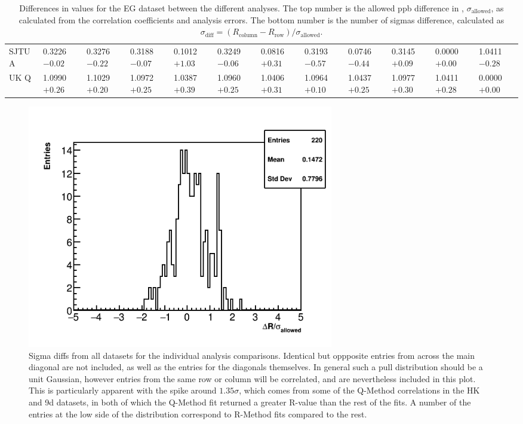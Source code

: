 \begin{landscape}
\begin{table}
\begin{tabularx}{1\linewidth}{@{\extracolsep{\fill}}lXXXXXXXXXXX}
	SJTU A & 0.3226 $-0.02$ & 0.3276 $-0.22$ & 0.3188 $-0.07$ & 0.1012 $+1.03$ & 0.3249 $-0.06$ & 0.0816 $+0.31$ & 0.3193 $-0.57$ & 0.0746 $-0.44$ & 0.3145 $+0.09$ & 0.0000 $+0.00$ & 1.0411 $-0.28$  \\
	UK Q   & 1.0990 $+0.26$ & 1.1029 $+0.20$ & 1.0972 $+0.25$ & 1.0387 $+0.39$ & 1.0960 $+0.25$ & 1.0406 $+0.31$ & 1.0964 $+0.10$ & 1.0437 $+0.25$ & 1.0977 $+0.30$ & 1.0411 $+0.28$ & 0.0000 $+0.00$  \\
  \bottomrule
\end{tabularx}
\caption[]{Differences in \R values for the EG dataset between the different analyses. The top number is the allowed ppb difference in \R, $\sigma_{\text{allowed}}$, as calculated from the correlation coefficients and analysis errors. The bottom number is the number of sigmas difference, calculated as $\sigma_{\text{diff}} = (R_{\text{column}}-R_{\text{row}})/\sigma_{\text{allowed}}$.}
\label{tab:EG_diff}
\end{table}
\end{landscape}







\begin{figure}[]
\centering
\includegraphics[width=0.65\textwidth]{AllSigmas}
\caption{Sigma diffs from all datasets for the individual analysis comparisons. Identical but oppposite entries from across the main diagonal are not included, as well as the entries for the diagonals themselves. In general such a pull distribution should be a unit Gaussian, however entries from the same row or column will be correlated, and are nevertheless included in this plot. This is particularly apparent with the spike around $1.35\sigma$, which comes from some of the Q-Method correlations in the HK and 9d datasets, in both of which the Q-Method fit returned a greater R-value than the rest of the fits. A number of the entries at the low side of the distribution correspond to R-Method fits compared to the rest.}
\label{fig:AllSigmas}
\end{figure}



